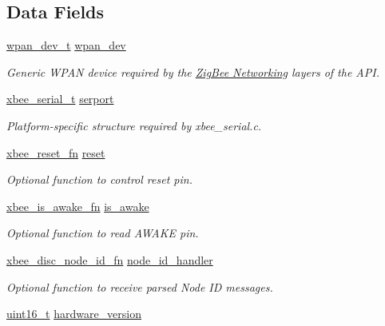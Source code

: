\subsection*{Data Fields}
\begin{DoxyCompactItemize}
\item 
\hyperlink{structwpan__dev__t}{wpan\+\_\+dev\+\_\+t} \hyperlink{group__xbee__device_ga8547395da056b57ba7c6b26c0c0f6ccf}{wpan\+\_\+dev}
\begin{DoxyCompactList}\small\item\em Generic W\+P\+AN device required by the \hyperlink{group__zigbee}{Zig\+Bee Networking} layers of the A\+PI. \end{DoxyCompactList}\item 
\hyperlink{structxbee__serial__t}{xbee\+\_\+serial\+\_\+t} \hyperlink{group__xbee__device_ga3145a7888ffabfc3f10e8e85ced0c686}{serport}
\begin{DoxyCompactList}\small\item\em Platform-\/specific structure required by xbee\+\_\+serial.\+c. \end{DoxyCompactList}\item 
\hyperlink{group__xbee__device_gaa6b2701f8516c2947424178c4bacab83}{xbee\+\_\+reset\+\_\+fn} \hyperlink{group__xbee__device_ga1f3cf44cb21be8f101d33062a9d2cf97}{reset}
\begin{DoxyCompactList}\small\item\em Optional function to control reset pin. \end{DoxyCompactList}\item 
\hyperlink{group__xbee__device_ga47d67ee70583d9a2a0cf7ae1eb672af8}{xbee\+\_\+is\+\_\+awake\+\_\+fn} \hyperlink{group__xbee__device_gaf17bb63b8639d0278a2d0ad259865930}{is\+\_\+awake}
\begin{DoxyCompactList}\small\item\em Optional function to read A\+W\+A\+KE pin. \end{DoxyCompactList}\item 
\hyperlink{group__xbee__device_ga64bf72cf58030a080f12f8916cd7d2a2}{xbee\+\_\+disc\+\_\+node\+\_\+id\+\_\+fn} \hyperlink{group__xbee__device_ga4952189ed8b46b133b5298b4fce75ab8}{node\+\_\+id\+\_\+handler}
\begin{DoxyCompactList}\small\item\em Optional function to receive parsed Node ID messages. \end{DoxyCompactList}\item 
\hyperlink{group__hal__dos_ga5a8b2dc9e45a9ee81a94ef304fb62505}{uint16\+\_\+t} \hyperlink{group__xbee__device_gad4c7c16c071f95965e2e506752b450fe}{hardware\+\_\+version}

\end{DoxyCompactItemize}
